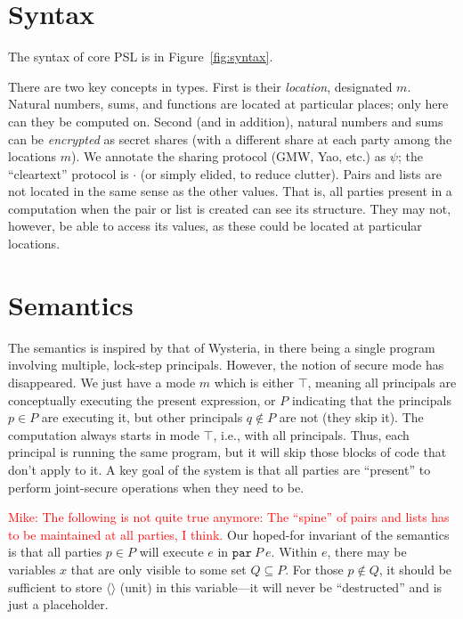 \documentclass[10pt]{article}
\newcommand{\kw}[1]{\ensuremath{\mathtt{#1}}}
\newcommand{\epar}[2]{\ensuremath{\kw{par}~{#1}~{#2}}}
\newcommand{\mwh}[1]{\textcolor{red}{Mike: #1}}
\begin{document}
\section{Syntax}
  
The syntax of core PSL is in Figure~\ref{fig:syntax}.

There are two key concepts in types. First is their \emph{location},
designated $m$. Natural numbers, sums, and functions are located at
particular places; only here can they be computed on. Second (and in
addition), natural numbers and sums can be \emph{encrypted} as secret
shares (with a different share at each party among the locations
$m$). We annotate the sharing protocol (GMW, Yao, etc.) as $\psi$; the
``cleartext'' protocol is $\cdot$ (or simply elided, to reduce
clutter). Pairs and lists are not located in the same sense as the
other values. That is, all parties present in a computation when the
pair or list is created can see its structure. They may not, however,
be able to access its values, as these could be located at particular
locations.

\section{Semantics}

The semantics is inspired by that of Wysteria, in there being a single
program involving multiple, lock-step principals. However, the notion
of secure mode has disappeared. We just have a mode $m$ which is
either $\top$, meaning all principals are conceptually executing the
present expression, or $P$ indicating that the principals
$p \in P$ are executing it, but other principals $q \not\in P$ are not
(they skip it). The computation always starts in mode $\top$, i.e.,
with all principals. Thus, each principal is running the same program,
but it will skip those blocks of code that don't apply to it.  A key
goal of the system is that all parties are ``present'' to perform
joint-secure operations when they need to be.

\mwh{The following is not quite true anymore: The ``spine'' of pairs
  and lists has to be maintained at all parties, I think.}
Our hoped-for invariant of the semantics is that all parties $p \in P$
will execute $e$ in $\epar{P}{e}$. Within $e$, there may be variables
$x$ that are only visible to some set $Q \subseteq P$. For those
$p \not\in Q$, it should be sufficient to store $\langle \rangle$
(unit) in this variable---it will never be ``destructed'' and is just
a placeholder.
\end{document}
